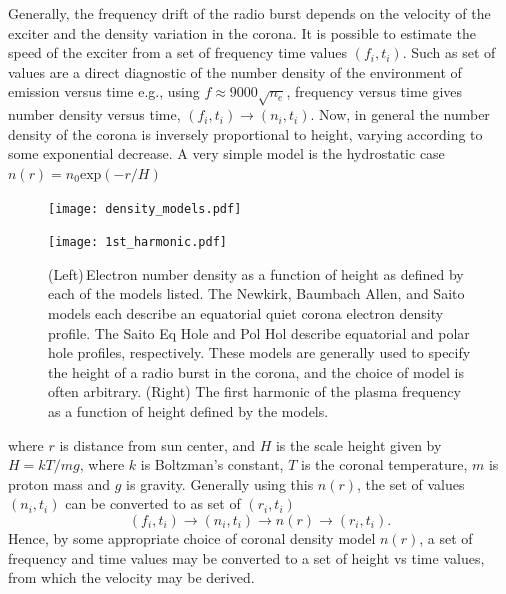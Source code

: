 Generally, the frequency drift of the radio burst depends on the velocity of the exciter and the density variation in the corona. It is possible to estimate the speed of the exciter from a set of frequency time values $(f_i, t_i)$. Such as set of values are a direct diagnostic of the number density of the environment of emission versus time e.g., using $f \approx 9000\sqrt{n_e}$, frequency versus time gives number density versus time, $(f_i, t_i) \rightarrow (n_i,t_i)$.
Now, in general the number density of the corona is inversely proportional to height, varying according to some exponential decrease. A very simple model is the hydrostatic case $n(r) = n_0\mathrm{exp}(-r/H)$
\begin{figure}[t!]
\begin{minipage}[]{0.5\linewidth}
\centering
\texttt{[image: density\_models.pdf]}
\end{minipage}
\hspace{0.1cm}
\begin{minipage}[]{0.3\linewidth}
\texttt{[image: 1st\_harmonic.pdf]}
\end{minipage}
\caption[Various models for electron number density in the corona]{(Left)\,Electron number density as a function of height as defined by each of the models listed. The Newkirk, Baumbach Allen, and Saito models each describe an equatorial quiet corona electron density profile. The Saito Eq Hole and Pol Hol describe equatorial and polar hole profiles, respectively. These models are generally used to specify the height of a radio burst in the corona, and the choice of model is often arbitrary. (Right) The first harmonic of the plasma frequency as a function of height defined by the models.}%
\label{fig:frequency_model}
\end{figure}
where $r$ is distance from sun center, and $H$ is the scale height given by $H = kT/mg$, where $k$ is Boltzman's constant, $T$ is the coronal temperature, $m$ is proton mass and $g$ is gravity. Generally using this $n(r)$, the set of values $(n_i,t_i)$ can be converted to as set of $(r_i,t_i)$
\begin{equation}
(f_i, t_i) \rightarrow (n_i,t_i) \rightarrow n(r) \rightarrow (r_i,t_i).
\end{equation}
Hence, by some appropriate choice of coronal density model $n(r)$, a set of frequency and time values may be converted to a set of height vs time values, from which the velocity may be derived.
